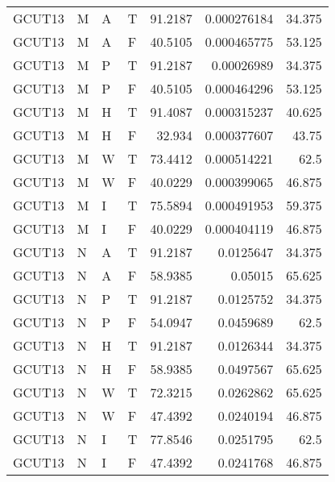 \begin{tabular}{llllrrr}
    GCUT13   & M     & A     & T          & 91.2187    & 0.000276184 & 34.375   \\
    GCUT13   & M     & A     & F          & 40.5105    & 0.000465775 & 53.125   \\
    GCUT13   & M     & P     & T          & 91.2187    & 0.00026989  & 34.375   \\
    GCUT13   & M     & P     & F          & 40.5105    & 0.000464296 & 53.125   \\
    GCUT13   & M     & H     & T          & 91.4087    & 0.000315237 & 40.625   \\
    GCUT13   & M     & H     & F          & 32.934     & 0.000377607 & 43.75    \\
    GCUT13   & M     & W     & T          & 73.4412    & 0.000514221 & 62.5     \\
    GCUT13   & M     & W     & F          & 40.0229    & 0.000399065 & 46.875   \\
    GCUT13   & M     & I     & T          & 75.5894    & 0.000491953 & 59.375   \\
    GCUT13   & M     & I     & F          & 40.0229    & 0.000404119 & 46.875   \\
    GCUT13   & N     & A     & T          & 91.2187    & 0.0125647   & 34.375   \\
    GCUT13   & N     & A     & F          & 58.9385    & 0.05015     & 65.625   \\
    GCUT13   & N     & P     & T          & 91.2187    & 0.0125752   & 34.375   \\
    GCUT13   & N     & P     & F          & 54.0947    & 0.0459689   & 62.5     \\
    GCUT13   & N     & H     & T          & 91.2187    & 0.0126344   & 34.375   \\
    GCUT13   & N     & H     & F          & 58.9385    & 0.0497567   & 65.625   \\
    GCUT13   & N     & W     & T          & 72.3215    & 0.0262862   & 65.625   \\
    GCUT13   & N     & W     & F          & 47.4392    & 0.0240194   & 46.875   \\
    GCUT13   & N     & I     & T          & 77.8546    & 0.0251795   & 62.5     \\
    GCUT13   & N     & I     & F          & 47.4392    & 0.0241768   & 46.875   \\
    \hline
\end{tabular}